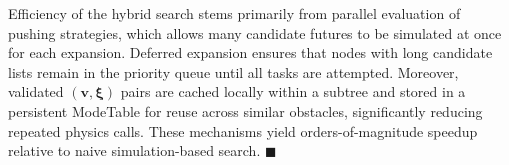 \begin{remark}\label{remark:simloop}
Efficiency of the hybrid search stems primarily from parallel evaluation of
pushing strategies, which allows many candidate futures to be simulated at once
for each expansion. Deferred expansion ensures that nodes with long candidate
lists remain in the priority queue until all tasks are attempted.
Moreover, validated $(\mathbf{v},\boldsymbol{\xi})$ pairs
are cached locally within a subtree and stored in a persistent ModeTable for
reuse across similar obstacles, significantly reducing repeated physics calls.
These mechanisms yield orders-of-magnitude speedup relative to naive
simulation-based search. \hfill$\blacksquare$
\end{remark}
